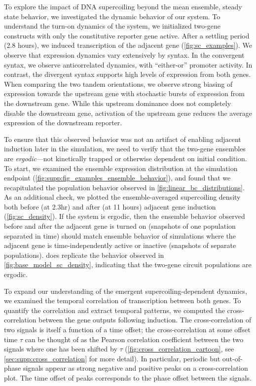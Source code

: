 \documentclass[11pt]{article}
\begin{document}
To explore the impact of DNA supercoiling beyond the mean ensemble, steady state behavior, we investigated the dynamic behavior of our system. To understand the turn-on dynamics of the system, we initialized two-gene constructs with only the constitutive reporter gene active. After a settling period (2.8 hours), we induced transcription of the adjacent gene (\cref{fig:sc_examples}).
We observe that expression dynamics vary extensively by syntax. In the convergent syntax, we observe anticorrelated dynamics, with ``either-or'' promoter activity. In contrast, the divergent syntax supports high levels of expression from both genes. When comparing the two tandem orientations, we observe strong biasing of expression towards the upstream gene with stochastic bursts of expression from the downstream gene. While this upstream dominance does not completely disable the downstream gene, activation of the upstream gene reduces the average expression of the downstream reporter. 

To ensure that this observed behavior was not an artifact of enabling adjacent induction later in the simulation, we need to verify that the two-gene ensembles are \emph{ergodic}---not kinetically trapped or otherwise dependent on initial condition. To start, we examined the ensemble expression distribution at the simulation endpoint (\cref{fig:supp:fig_examples_ensemble_behavior}), and found that we recapitulated the population behavior observed in \cref{fig:linear_bc_distributions}. As an additional check, we plotted the ensemble-averaged supercoiling density both before (at 2.3hr) and after (at 11 hours) adjacent gene induction (\cref{fig:sc_density}). If the system is ergodic, then the ensemble behavior observed before and after the adjacent gene is turned on (snapshots of one population separated in time) should match ensemble behavior of simulations where the adjacent gene is time-independently active or inactive (snapshots of separate populations).  does replicate the behavior observed in \cref{fig:base_model_sc_density}, indicating that the two-gene circuit populations are ergodic.
 

To expand our understanding of the emergent supercoiling-dependent dynamics, we examined the temporal correlation of transcription between both genes. To quantify the correlation and extract temporal patterns, we computed the cross-correlation between the gene outputs following induction. The cross-correlation of two signals is itself a function of a time offset; the cross-correlation at some offset time \(\tau\) can be thought of as the Pearson correlation coefficient between the two signals where one has been shifted by \(\tau\) (\cref{fig:cross_correlation_cartoon}, see \cref{sec:supp:cross_correlation} for more detail). In particular, periodic but out-of-phase signals appear as strong negative and positive peaks on a cross-correlation plot.  The time offset of peaks corresponds to the phase offset between the signals.
\end{document}
